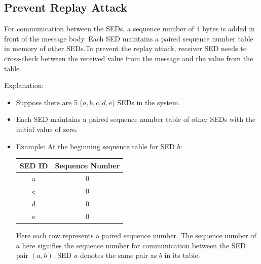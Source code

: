 \documentclass[11pt,oneside,onecolumn,letterpaper]{article}
\begin{document}
  \subsection{Prevent Replay Attack}
  For communication between the SEDs, a sequence number of 4 bytes is added in front of the message body. Each SED maintains a paired sequence number table in memory of other SEDs.To prevent the replay attack, receiver SED needs to cross-check between the received value from the message and the value from the table.
 
Explanation:
  \begin{itemize}
  \item Suppose there are 5 ($a, b, c, d, e$) SEDs in the system.
  \item Each SED maintains a paired sequence number table of other SEDs with the initial value of zero.
  \item  Example: At the beginning sequence table for SED $b$:

    \begin{center}
  \begin{tabular}{ |c|c| } 
   \hline
  \textbf{SED ID} & \textbf{Sequence Number} \\
 	\hline \hline
 	a & 0 \\ 
	c & 0  \\ 
 	d & 0 \\ 
 	e & 0 \\ 
	 \hline
\end{tabular}
\end{center}
Here each row represents a paired sequence number.
The sequence number of $a$ here signifies the sequence number for communication between the SED pair $(a,b)$. SED $a$ denotes the same pair as $b$ in its table.


\end{itemize}
\end{document}
